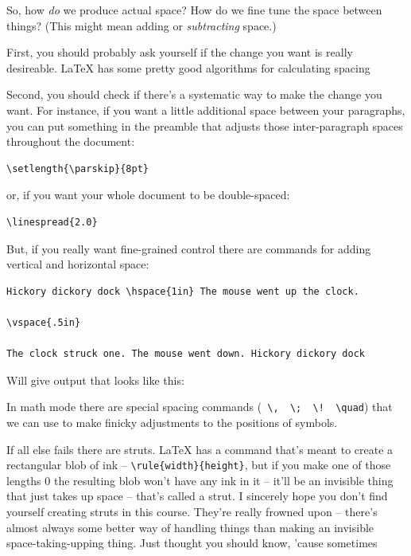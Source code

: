 So, how {\em do} we produce actual space?  How do we fine tune the space between things?  (This might mean adding or {\em subtracting} space.)

First, you should probably ask yourself if the change you want is really desireable.  \LaTeX{}  has some pretty good algorithms for calculating spacing\textellipsis

Second, you should check if there's a systematic way to make the change you want.  For instance, if you want a little additional space between your paragraphs, you can put something in the preamble that adjusts those inter-paragraph spaces throughout the document:

\begin{codeblock}
\begin{verbatim}
\setlength{\parskip}{8pt}
\end{verbatim}
\end{codeblock}

\noindent or, if you want your whole document to be double-spaced:

\begin{codeblock}
\begin{verbatim}
\linespread{2.0}
\end{verbatim}
\end{codeblock}

But, if you really want fine-grained control there are commands for adding vertical and horizontal space:

\begin{codeblock}
\begin{verbatim}
Hickory dickory dock \hspace{1in} The mouse went up the clock.

\vspace{.5in}

The clock struck one. The mouse went down. Hickory dickory dock
\end{verbatim}
\end{codeblock}

Will give output that looks like this:

\begin{center}
\end{center}

In math mode there are special spacing commands (\verb+ \,  \;  \!  \quad+) that we can use to make finicky adjustments to the positions of symbols.  

If all else fails there are struts.  \LaTeX{} has a command that's meant to create a rectangular blob of ink -- 
\verb+\rule{width}{height}+, but if you make one of those lengths $0$ the resulting blob won't have any ink in it -- it'll be an invisible thing that just takes up space -- that's called a strut.  I sincerely hope you don't find yourself creating struts in this course.  They're really frowned upon -- there's almost always some better way of handling things than making an invisible space-taking-upping thing.  Just thought you should know, 'cause sometimes\textellipsis

